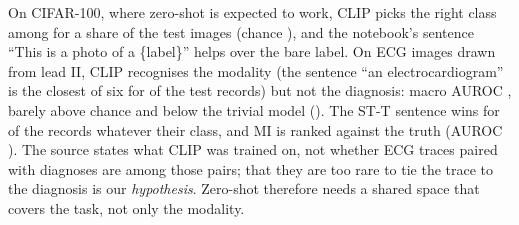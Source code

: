 


On CIFAR-100, where zero-shot is expected to work, CLIP picks the right class among
\zeroshotCifarNClasses{} for a share \zeroshotCifarTopOneNotebook{} of the test images (chance
\zeroshotCifarChanceTopOne{}), and the notebook's sentence ``This is a photo of a \{label\}'' helps
over the bare label. On ECG images drawn from lead II, CLIP recognises the modality (the sentence
``an electrocardiogram'' is the closest of six for \zeroshotFracModalityEcgTestPct{} of the test
records) but not the diagnosis: macro AUROC \zeroshotTestMacroAuroc{}, barely above chance and below
the trivial model (\comparisonTestDiffMeanZeroshotVsTrivial{}). The ST-T sentence wins for
\zeroshotFracTopSTTCTestPct{} of the records whatever their class, and MI is ranked against the truth
(AUROC \zeroshotTestAurocMI{}). The source states what CLIP was trained on, not whether ECG traces
paired with diagnoses are among those pairs; that they are too rare to tie the trace to the diagnosis
is our \emph{hypothesis}. Zero-shot therefore needs a shared space that covers the task, not only the
modality.
